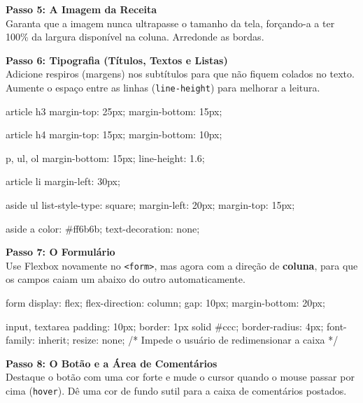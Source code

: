 \documentclass[12pt,a4paper]{article}
\begin{document}
\noindent\textbf{Passo 5: A Imagem da Receita}\\
Garanta que a imagem nunca ultrapasse o tamanho da tela, forçando-a a ter 100\% da largura disponível na coluna. Arredonde as bordas.


\noindent\textbf{Passo 6: Tipografia (Títulos, Textos e Listas)}\\
Adicione respiros (margens) nos subtítulos para que não fiquem colados no texto. Aumente o espaço entre as linhas (\verb|line-height|) para melhorar a leitura.

\begin{codecss}
article h3 {
    margin-top: 25px;
    margin-bottom: 15px;
}

article h4 {
    margin-top: 15px;
    margin-bottom: 10px;
}

p, ul, ol {
    margin-bottom: 15px;
    line-height: 1.6;
}

article li {
    margin-left: 30px;
}

aside ul {
    list-style-type: square;
    margin-left: 20px;
    margin-top: 15px;
}

aside a {
    color: #ff6b6b;
    text-decoration: none;
}
\end{codecss}

\noindent\textbf{Passo 7: O Formulário}\\
Use Flexbox novamente no \verb|<form>|, mas agora com a direção de \textbf{coluna}, para que os campos caiam um abaixo do outro automaticamente.

\begin{codecss}
form {
    display: flex;
    flex-direction: column;
    gap: 10px;
    margin-bottom: 20px;
}

input, textarea {
    padding: 10px;
    border: 1px solid #ccc;
    border-radius: 4px;
    font-family: inherit;
    resize: none; /* Impede o usuário de redimensionar a caixa */
}
\end{codecss}

\noindent\textbf{Passo 8: O Botão e a Área de Comentários}\\
Destaque o botão com uma cor forte e mude o cursor quando o mouse passar por cima (\verb|hover|). Dê uma cor de fundo sutil para a caixa de comentários postados.
\end{document}
